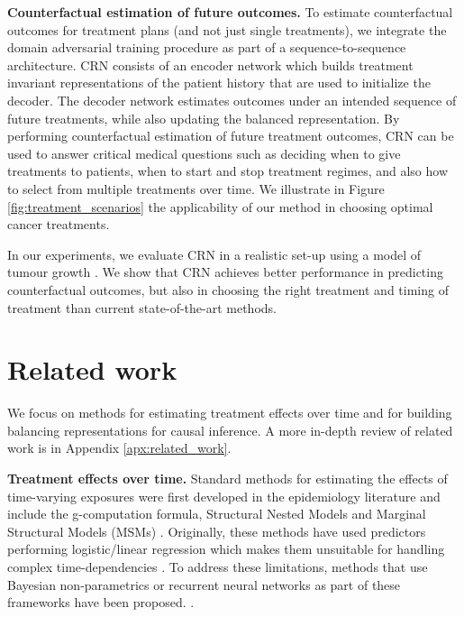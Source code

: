 \documentclass{article} %
\begin{document}
	\textbf{Counterfactual estimation of future outcomes.} To estimate counterfactual outcomes for treatment plans (and not just single treatments), we integrate the domain adversarial training procedure as part of a sequence-to-sequence architecture. CRN consists of an encoder network which builds treatment invariant representations of the patient history that are used to initialize the decoder. The decoder network estimates outcomes under an intended sequence of future treatments, while also updating the balanced representation. By performing counterfactual estimation of future treatment outcomes, CRN can be used to answer critical medical questions such as deciding when to give treatments to patients, when to start and stop treatment regimes, and also how to select from multiple treatments over time. We illustrate in Figure \ref{fig:treatment_scenarios} the applicability of our method in choosing optimal cancer treatments. 
	
	In our experiments, we evaluate CRN in a realistic set-up using a model of tumour growth \citep{geng2017prediction}. We show that CRN achieves better performance in predicting counterfactual outcomes, but also in choosing the right treatment and timing of treatment than current state-of-the-art methods. 

	\section{Related work}
	
    We focus on methods for estimating  treatment effects over time and for building balancing representations for causal inference. A more in-depth review of related work is in Appendix \ref{apx:related_work}. 

	\textbf{Treatment effects over time.} Standard methods for estimating the effects of time-varying exposures were first developed in the epidemiology literature and include the g-computation formula, Structural Nested Models and Marginal Structural Models (MSMs) \citep{robins1986new, robins1994correcting, robins2000marginal, robins2008estimation}. Originally, these methods have used predictors performing logistic/linear regression which makes them unsuitable for handling complex time-dependencies \citep{hernan2001marginal, mansournia2012effect, mortimer2005application}. To address these limitations, methods that use Bayesian non-parametrics or recurrent neural networks as part of these frameworks have been proposed. \citep{xu2016bayesian, roy2016bayesian, lim2018forecasting}. 
	
\end{document}
